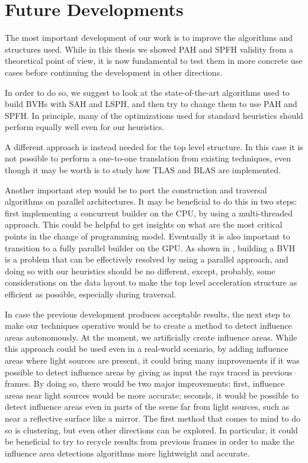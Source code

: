 \documentclass{PoliMi_MasterThesis}
\begin{document}
\section{Future Developments} \label{sec:future_developments}
The most important development of our work is to improve the algorithms and structures used. While in this thesis we showed PAH and SPFH validity from a theoretical point of view, it is now fundamental to test them in more concrete use cases before continuing the development in other directions.

In order to do so, we suggest to look at the state-of-the-art algorithms used to build BVHs with SAH and LSPH, and then try to change them to use PAH and SPFH. In principle, many of the optimizations used for standard heuristics should perform equally well even for our heuristics.

A different approach is instead needed for the top level structure. In this case it is not possible to perform a one-to-one translation from existing techniques, even though it may be worth is to study how TLAS and BLAS \cite{TODO} are implemented.

Another important step would be to port the construction and traversal algorithms on parallel architectures. It may be beneficial to do this in two steps: first implementing a concurrent builder on the CPU, by using a multi-threaded approach. This could be helpful to get insights on what are the most critical points in the change of programming model. Eventually it is also important to transition to a fully parallel builder on the GPU. As shown in \cite{TODO}, building a BVH is a problem that can be effectively resolved by using a parallel approach, and doing so with our heuristics should be no different, except, probably, some considerations on the data layout to make the top level acceleration structure as efficient as possible, especially during traversal.

In case the previous development produces acceptable results, the next step to make our techniques operative would be to create a method to detect influence areas autonomously. At the moment, we artificially create influence areas. While this approach could be used even in a real-world scenario, by adding influence areas where light sources are present, it could bring many improvements if it was possible to detect influence areas by giving as input the rays traced in previous frames. By doing so, there would be two major improvements: first, influence areas near light sources would be more accurate; seconds, it would be possible to detect influence areas even in parts of the scene far from light sources, such as near a reflective surface like a mirror. The first method that comes to mind to do so is clustering, but even other directions can be explored. In particular, it could be beneficial to try to recycle results from previous frames in order to make the influence area detections algorithms more lightweight and accurate.
\end{document}
